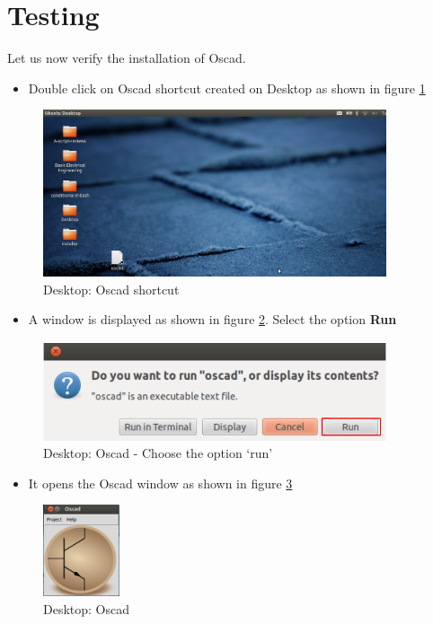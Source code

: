 \section {Testing}
Let us now verify the installation of Oscad.
\begin{itemize}
\item Double click on Oscad shortcut created on Desktop as shown in figure \ref{osc}\\
\end{itemize}
\begin{figure}[h]
\centering
\includegraphics[width=0.9\textwidth]{figures/screenshot1.png}
\caption{Desktop: Oscad shortcut}
\label{osc}
\end{figure}
\newpage
\begin{itemize}
\item A window is displayed as shown in figure \ref{tab}. Select the option \textbf{Run}\\
\end{itemize}
\begin{figure}[h]
\centering
\includegraphics[width=0.9\textwidth]{figures/run.png}
\caption{Desktop: Oscad - Choose the option `run' }
\label{tab}
\end{figure}
\begin{itemize}
\item It opens the Oscad window as shown in figure \ref{window}
\end{itemize}
\begin{figure}[h]
\centering
\includegraphics[width=0.2\textwidth]{figures/oscadicon.png}
\caption{Desktop: Oscad }
\label{window}
\end{figure}
